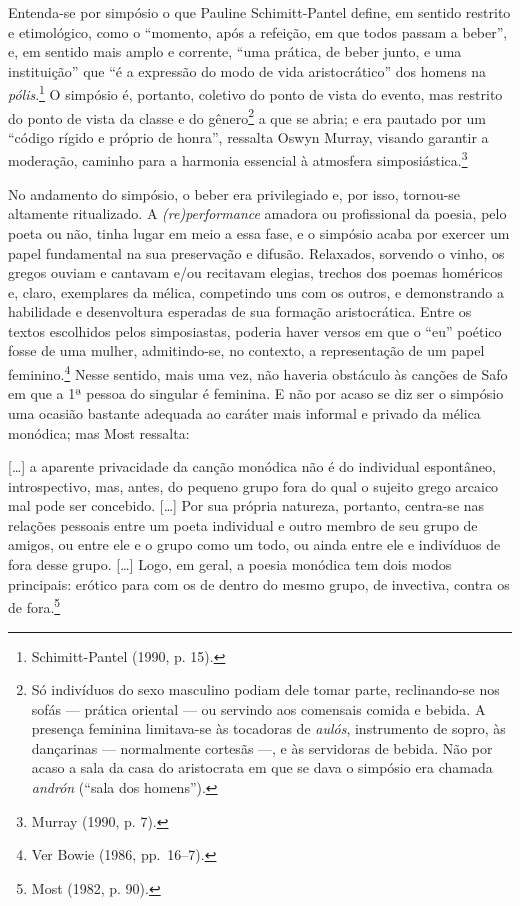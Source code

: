 Entenda-se por simpósio o que Pauline Schimitt-Pantel define, em
sentido restrito e etimológico, como o “momento, após a refeição, em que todos
passam a beber”, e, em sentido mais amplo e corrente, “uma prática, de beber
junto, e uma instituição” que “é a expressão do modo de vida aristocrático” dos
homens na \textit{pólis}.\footnote{ Schimitt-Pantel (1990, p. 15).} O simpósio
é, portanto, coletivo do ponto de vista do
evento, mas restrito do ponto de vista da classe e do gênero\footnote{ Só
indivíduos do sexo masculino podiam dele tomar parte, reclinando-se nos sofás ---
prática oriental --- ou servindo aos comensais comida e bebida. A presença
feminina limitava-se às tocadoras de \textit{aulós}, instrumento de sopro, às
dançarinas --- normalmente cortesãs ---, e às servidoras de bebida. Não por acaso a
sala da casa do aristocrata em que se dava o simpósio era chamada
\textit{andrón} (“sala dos homens”).} a que se abria; e era pautado por um
“código rígido e próprio de honra”, ressalta Oswyn Murray, visando
garantir a moderação, caminho para a harmonia essencial à atmosfera
simposiástica.\footnote{ Murray (1990, p. 7).}

No andamento do simpósio, o beber era privilegiado e, por isso, tornou-se
altamente ritualizado. A \textit{(re)performance} amadora ou profissional da
poesia, pelo poeta ou não, tinha lugar em meio a essa fase, e o simpósio acaba
por exercer um papel fundamental na sua preservação e difusão. Relaxados,
sorvendo o vinho, os gregos ouviam e cantavam e/ou recitavam elegias, trechos
dos poemas homéricos e, claro, exemplares da mélica, competindo uns com os
outros, e demonstrando a habilidade e desenvoltura esperadas de sua formação
aristocrática. Entre os textos escolhidos pelos simposiastas, poderia haver
versos em que o “eu” poético fosse de uma mulher, admitindo-se, no contexto, a
representação de um papel feminino.\footnote{ Ver Bowie (1986, pp.~16--7).}
Nesse sentido, mais uma vez, não haveria obstáculo às canções de Safo em que a
1ª pessoa do singular é feminina. E não por acaso se diz ser o simpósio uma
ocasião bastante adequada ao caráter mais informal e privado da mélica
monódica; mas Most ressalta:

\begin{hedraquote}
\mbox[\ldots{}] a aparente privacidade da canção monódica não é do individual espontâneo,
introspectivo, mas, antes, do pequeno grupo fora do qual o sujeito grego
arcaico mal pode ser concebido. [\ldots{}] Por sua própria natureza, portanto,
centra-se nas relações pessoais entre um poeta individual e outro membro de seu
grupo de amigos, ou entre ele e o grupo como um todo, ou ainda entre ele e
indivíduos de fora desse grupo. [\ldots{}] Logo, em geral, a poesia monódica tem
dois modos principais: erótico para com os de dentro do mesmo grupo, de
invectiva, contra os de fora.\footnote{ Most (1982, p. 90).}
\end{hedraquote}

